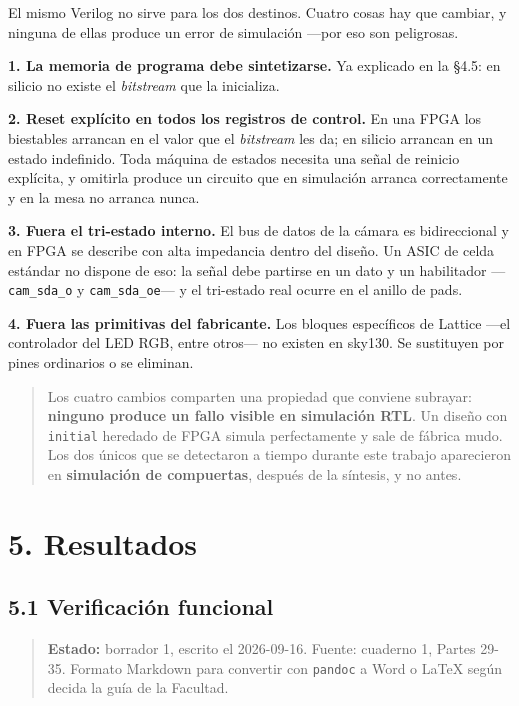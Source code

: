 El mismo Verilog no sirve para los dos destinos. Cuatro cosas hay que
cambiar, y ninguna de ellas produce un error de simulación ---por eso
son peligrosas.

\textbf{1. La memoria de programa debe sintetizarse.} Ya explicado en la
§4.5: en silicio no existe el \emph{bitstream} que la inicializa.

\textbf{2. Reset explícito en todos los registros de control.} En una
FPGA los biestables arrancan en el valor que el \emph{bitstream} les da;
en silicio arrancan en un estado indefinido. Toda máquina de estados
necesita una señal de reinicio explícita, y omitirla produce un circuito
que en simulación arranca correctamente y en la mesa no arranca nunca.

\textbf{3. Fuera el tri-estado interno.} El bus de datos de la cámara es
bidireccional y en FPGA se describe con alta impedancia dentro del
diseño. Un ASIC de celda estándar no dispone de eso: la señal debe
partirse en un dato y un habilitador ---\texttt{cam\_sda\_o} y
\texttt{cam\_sda\_oe}--- y el tri-estado real ocurre en el anillo de
pads.

\textbf{4. Fuera las primitivas del fabricante.} Los bloques específicos
de Lattice ---el controlador del LED RGB, entre otros--- no existen en
sky130. Se sustituyen por pines ordinarios o se eliminan.

\begin{quote}
Los cuatro cambios comparten una propiedad que conviene subrayar:
\textbf{ninguno produce un fallo visible en simulación RTL}. Un diseño
con \texttt{initial} heredado de FPGA simula perfectamente y sale de
fábrica mudo. Los dos únicos que se detectaron a tiempo durante este
trabajo aparecieron en \textbf{simulación de compuertas}, después de la
síntesis, y no antes.
\end{quote}

\chapter{5. Resultados}\label{resultados}

\section{5.1 Verificación funcional}\label{verificaciuxf3n-funcional}

\begin{quote}
\textbf{Estado:} borrador 1, escrito el 2026-09-16. Fuente: cuaderno 1,
Partes 29-35. Formato Markdown para convertir con \texttt{pandoc} a Word
o LaTeX según decida la guía de la Facultad.
\end{quote}

